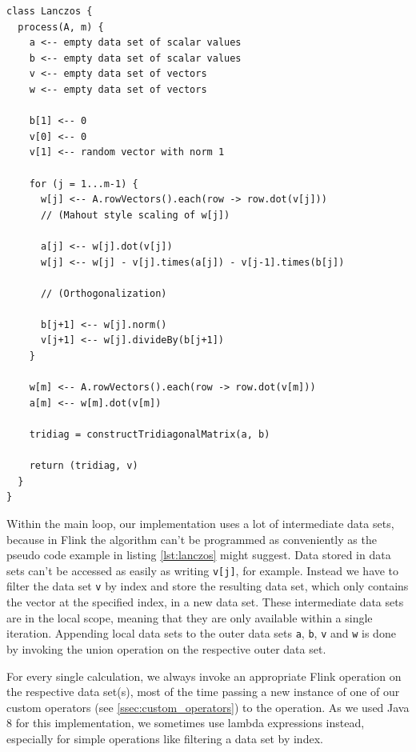 \begin{lstlisting}[label=lst:lanczos,captionpos=b,caption=Pseudo code of our
loop-based Lanczos algorithm implementation (simplified)]
class Lanczos {
  process(A, m) {
    a <-- empty data set of scalar values
    b <-- empty data set of scalar values
    v <-- empty data set of vectors
    w <-- empty data set of vectors
    
    b[1] <-- 0
    v[0] <-- 0
    v[1] <-- random vector with norm 1
    
    for (j = 1...m-1) {
      w[j] <-- A.rowVectors().each(row -> row.dot(v[j]))
      // (Mahout style scaling of w[j])
      
      a[j] <-- w[j].dot(v[j])
      w[j] <-- w[j] - v[j].times(a[j]) - v[j-1].times(b[j])
      
      // (Orthogonalization)
      
      b[j+1] <-- w[j].norm()
      v[j+1] <-- w[j].divideBy(b[j+1])
    }
    
    w[m] <-- A.rowVectors().each(row -> row.dot(v[m]))
    a[m] <-- w[m].dot(v[m])
    
    tridiag = constructTridiagonalMatrix(a, b)
    
    return (tridiag, v)
  }
}
\end{lstlisting}

Within the main loop, our implementation uses a lot of intermediate data sets,
because in Flink the algorithm can't be programmed as conveniently as the
pseudo code example in listing \ref{lst:lanczos} might suggest. Data stored in
data sets can't be accessed as easily as writing \texttt{v[j]}, for example.
Instead we have to filter the data set \texttt{v} by index and store the
resulting data set, which only contains the vector at the specified index, in a
new data set. These intermediate data sets are in the local scope, meaning that
they are only available within a single iteration. Appending local data sets to
the outer data sets \texttt{a}, \texttt{b}, \texttt{v} and \texttt{w} is done
by invoking the union operation on the respective outer data set.

For every single calculation, we always invoke an appropriate Flink operation
on the respective data set(s), most of the time passing a new instance of one
of our custom operators (see \ref{ssec:custom_operators}) to the operation. As
we used Java 8 for this implementation, we sometimes use lambda expressions
instead, especially for simple operations like filtering a data set by index.

